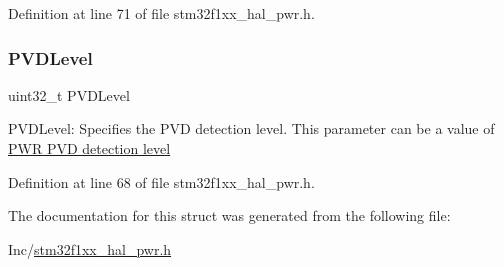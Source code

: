 Definition at line 71 of file stm32f1xx\+\_\+hal\+\_\+pwr.\+h.

\mbox{\label{struct_p_w_r___p_v_d_type_def_abf0db5c2b84ba24ffeedab5cf06bad31}} 
\subsubsection{\texorpdfstring{P\+V\+D\+Level}{PVDLevel}}
{\footnotesize\ttfamily uint32\+\_\+t P\+V\+D\+Level}

P\+V\+D\+Level\+: Specifies the P\+VD detection level. This parameter can be a value of \hyperlink{group___p_w_r___p_v_d__detection__level}{P\+WR P\+VD detection level} 

Definition at line 68 of file stm32f1xx\+\_\+hal\+\_\+pwr.\+h.



The documentation for this struct was generated from the following file\+:\begin{DoxyCompactItemize}
\item 
Inc/\hyperlink{stm32f1xx__hal__pwr_8h}{stm32f1xx\+\_\+hal\+\_\+pwr.\+h}\end{DoxyCompactItemize}

